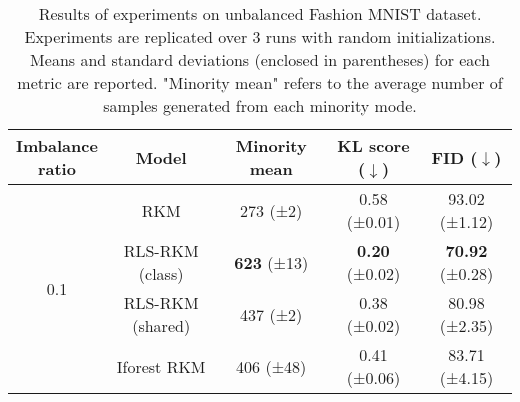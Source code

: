 \begin{table}[ht]
    \centering
    \begin{tabular}{ccccc}
\toprule
\makecell{Imbalance \\ ratio} & Model & Minority mean & KL score ($\downarrow$) & FID ($\downarrow$) \\
\midrule
\multirow{4}{*}{0.1} & RKM & 273 (±2) & 0.58 (±0.01) & 93.02 (±1.12) \\
& RLS-RKM (class) & \textbf{623} (±13) & \textbf{0.20} (±0.02) & \textbf{70.92} (±0.28) \\
& RLS-RKM (shared) & 437 (±2) & 0.38 (±0.02) & 80.98 (±2.35) \\
& Iforest RKM & 406 (±48) & 0.41 (±0.06) & 83.71 (±4.15) \\
\bottomrule
\end{tabular}
    \caption{Results of experiments on unbalanced Fashion MNIST dataset. Experiments are replicated over 3 runs with random initializations. Means and standard deviations (enclosed in parentheses) for each metric are reported. "Minority mean" refers to the average number of samples generated from each minority mode.}
    \label{tab-expr-fashion}
\end{table}